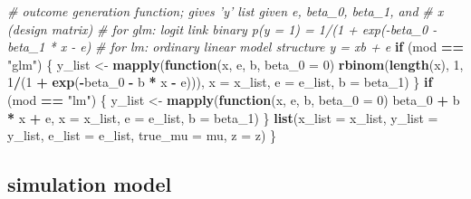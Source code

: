 \documentclass[
]{article}
\newenvironment{Shaded}{\begin{snugshade}}{\end{snugshade}}
\newcommand{\CommentTok}[1]{\textcolor[rgb]{0.56,0.35,0.01}{\textit{#1}}}
\newcommand{\ControlFlowTok}[1]{\textcolor[rgb]{0.13,0.29,0.53}{\textbf{#1}}}
\newcommand{\DataTypeTok}[1]{\textcolor[rgb]{0.13,0.29,0.53}{#1}}
\newcommand{\DecValTok}[1]{\textcolor[rgb]{0.00,0.00,0.81}{#1}}
\newcommand{\KeywordTok}[1]{\textcolor[rgb]{0.13,0.29,0.53}{\textbf{#1}}}
\newcommand{\NormalTok}[1]{#1}
\newcommand{\OperatorTok}[1]{\textcolor[rgb]{0.81,0.36,0.00}{\textbf{#1}}}
\newcommand{\StringTok}[1]{\textcolor[rgb]{0.31,0.60,0.02}{#1}}
\begin{document}
\begin{Shaded}
\begin{Highlighting}[]
  \CommentTok{# outcome generation function; gives 'y' list given e, beta_0, beta_1, and}
  \CommentTok{# x (design matrix)}
  \CommentTok{# for glm: logit link binary p(y = 1) = 1/(1 + exp(-beta_0 - beta_1 * x - e)}
  \CommentTok{# for lm: ordinary linear model structure y = xb + e}
  \ControlFlowTok{if}\NormalTok{ (mod }\OperatorTok{==}\StringTok{ "glm"}\NormalTok{) \{}
\NormalTok{    y_list <-}\StringTok{ }\KeywordTok{mapply}\NormalTok{(}\ControlFlowTok{function}\NormalTok{(x, e, b, }\DataTypeTok{beta_0 =} \DecValTok{0}\NormalTok{)}
      \KeywordTok{rbinom}\NormalTok{(}\KeywordTok{length}\NormalTok{(x), }\DecValTok{1}\NormalTok{, }\DecValTok{1}\OperatorTok{/}\NormalTok{(}\DecValTok{1} \OperatorTok{+}\StringTok{ }\KeywordTok{exp}\NormalTok{(}\OperatorTok{-}\NormalTok{beta_}\DecValTok{0} \OperatorTok{-}\StringTok{ }\NormalTok{b }\OperatorTok{*}\StringTok{ }\NormalTok{x }\OperatorTok{-}\StringTok{ }\NormalTok{e))),}
      \DataTypeTok{x =}\NormalTok{ x_list, }\DataTypeTok{e =}\NormalTok{ e_list, }\DataTypeTok{b =}\NormalTok{ beta_}\DecValTok{1}\NormalTok{)}
\NormalTok{  \}}
  \ControlFlowTok{if}\NormalTok{ (mod }\OperatorTok{==}\StringTok{ "lm"}\NormalTok{) \{}
\NormalTok{    y_list <-}\StringTok{ }\KeywordTok{mapply}\NormalTok{(}\ControlFlowTok{function}\NormalTok{(x, e, b, }\DataTypeTok{beta_0 =} \DecValTok{0}\NormalTok{)}
\NormalTok{      beta_}\DecValTok{0} \OperatorTok{+}\StringTok{ }\NormalTok{b }\OperatorTok{*}\StringTok{ }\NormalTok{x }\OperatorTok{+}\StringTok{ }\NormalTok{e, }\DataTypeTok{x =}\NormalTok{ x_list, }\DataTypeTok{e =}\NormalTok{ e_list, }\DataTypeTok{b =}\NormalTok{ beta_}\DecValTok{1}\NormalTok{)}
\NormalTok{  \}}
  \KeywordTok{list}\NormalTok{(}\DataTypeTok{x_list =}\NormalTok{ x_list, }\DataTypeTok{y_list =}\NormalTok{ y_list, }\DataTypeTok{e_list =}\NormalTok{ e_list, }\DataTypeTok{true_mu =}\NormalTok{ mu, }\DataTypeTok{z =}\NormalTok{ z)}
\NormalTok{\}}
\end{Highlighting}
\end{Shaded}

\hypertarget{simulation-model}{%
\subsection{simulation model}\label{simulation-model}}
\end{document}
